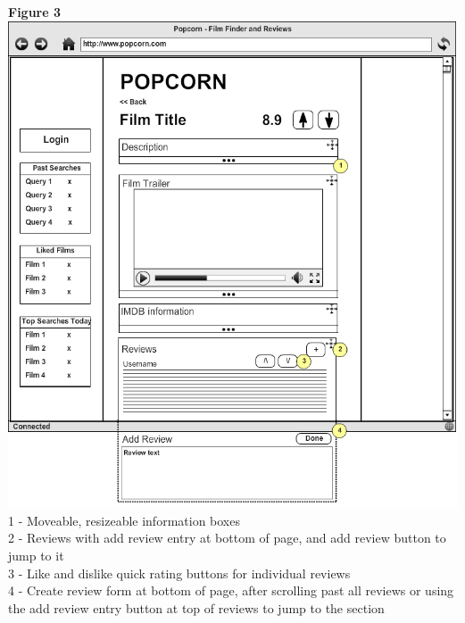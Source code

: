 \documentclass{sig-alt-release2}
\begin{document}
\newpage
\textbf{Figure 3}\\
\includegraphics[scale=0.33]{wireframe3.png}
1 - Moveable, resizeable information boxes \\
2 - Reviews with add review entry at bottom of page, and add review button to jump to it \\
3 - Like and dislike quick rating buttons for individual reviews \\
4 - Create review form at bottom of page, after scrolling past all reviews or using the add review entry button at top of reviews to jump to the section\\
\end{document}

